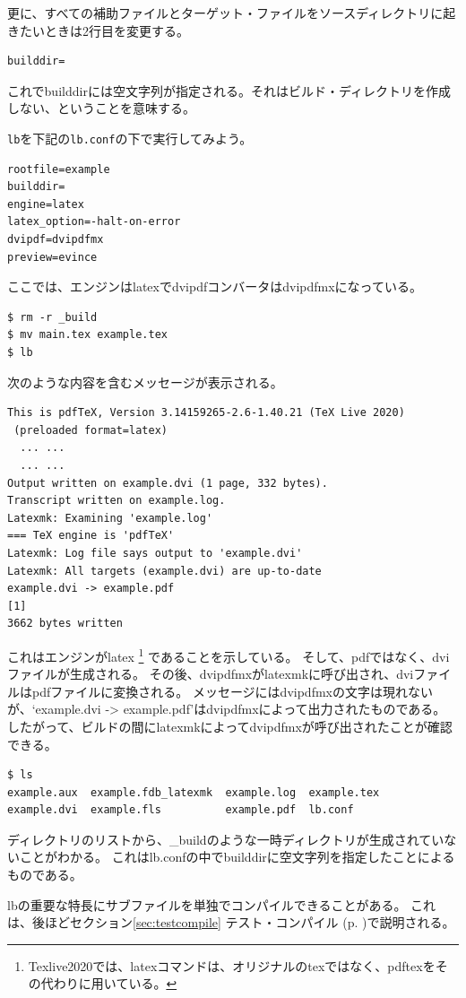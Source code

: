更に、すべての補助ファイルとターゲット・ファイルをソースディレクトリに起きたいときは2行目を変更する。
\begin{verbatim}
builddir=
\end{verbatim}
これでbuilddirには空文字列が指定される。それはビルド・ディレクトリを作成しない、ということを意味する。

\verb|lb|を下記の\verb|lb.conf|の下で実行してみよう。
\begin{verbatim}
rootfile=example
builddir=
engine=latex
latex_option=-halt-on-error
dvipdf=dvipdfmx
preview=evince
\end{verbatim}
ここでは、エンジンはlatexでdvipdfコンバータはdvipdfmxになっている。
\begin{verbatim}
$ rm -r _build
$ mv main.tex example.tex
$ lb
\end{verbatim}
次のような内容を含むメッセージが表示される。
\begin{verbatim}
This is pdfTeX, Version 3.14159265-2.6-1.40.21 (TeX Live 2020)
 (preloaded format=latex)
  ... ...
  ... ...
Output written on example.dvi (1 page, 332 bytes).
Transcript written on example.log.
Latexmk: Examining 'example.log'
=== TeX engine is 'pdfTeX'
Latexmk: Log file says output to 'example.dvi'
Latexmk: All targets (example.dvi) are up-to-date
example.dvi -> example.pdf
[1]
3662 bytes written
\end{verbatim}
これはエンジンがlatex%
\footnote{
Texlive2020では、latexコマンドは、オリジナルのtexではなく、pdftexをその代わりに用いている。
}
であることを示している。
そして、pdfではなく、dviファイルが生成される。
その後、dvipdfmxがlatexmkに呼び出され、dviファイルはpdfファイルに変換される。
メッセージにはdvipdfmxの文字は現れないが、`example.dvi -{\textgreater} example.pdf'はdvipdfmxによって出力されたものである。
したがって、ビルドの間にlatexmkによってdvipdfmxが呼び出されたことが確認できる。
\begin{verbatim}
$ ls
example.aux  example.fdb_latexmk  example.log  example.tex
example.dvi  example.fls          example.pdf  lb.conf
\end{verbatim}
ディレクトリのリストから、\_buildのような一時ディレクトリが生成されていないことがわかる。
これはlb.confの中でbuilddirに空文字列を指定したことによるものである。

lbの重要な特長にサブファイルを単独でコンパイルできることがある。
これは、後ほどセクション\ref{sec:testcompile} テスト・コンパイル (p. \pageref{sec:testcompile})で説明される。
